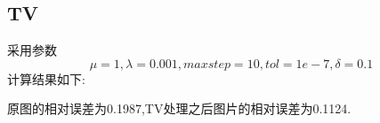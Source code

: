 \documentclass[a4paper,  11pt]{ctexart}
\begin{document}
\subsection{TV}
采用参数
\[  
  \mu = 1, \lambda = 0.001, maxstep = 10, tol = 1e-7, \delta = 0.1
\]
计算结果如下:
\begin{figure}[H]
\end{figure}
原图的相对误差为0.1987,TV处理之后图片的相对误差为0.1124.
\end{document}
